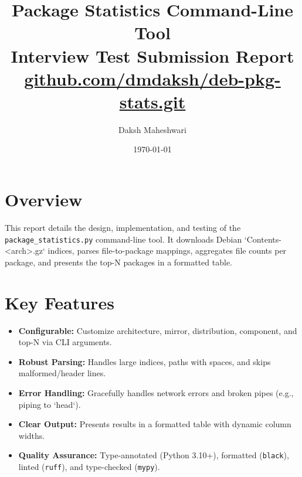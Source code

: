\documentclass[10pt,a4paper]{article}
\title{Package Statistics Command-Line Tool \\ \large Interview Test Submission Report \\ \normalsize \href{https://github.com/dmdaksh/deb-pkg-stats.git}{github.com/dmdaksh/deb-pkg-stats.git}}
\author{Daksh Maheshwari}
\date{\today}
\begin{document}
\pagestyle{empty}
\small %
\maketitle
\vspace{-1.5em} %

\section*{Overview}
\vspace{-0.5em} %
This report details the design, implementation, and testing of the \texttt{package\_statistics.py} command-line tool. It downloads Debian `Contents-<arch>.gz` indices, parses file-to-package mappings, aggregates file counts per package, and presents the top-N packages in a formatted table.

\section*{Key Features}
\vspace{-0.5em}
\begin{itemize}
	\item \textbf{Configurable:} Customize architecture, mirror, distribution, component, and top-N via CLI arguments.
	\item \textbf{Robust Parsing:} Handles large indices, paths with spaces, and skips malformed/header lines.
	\item \textbf{Error Handling:} Gracefully handles network errors and broken pipes (e.g., piping to `head`).
	\item \textbf{Clear Output:} Presents results in a formatted table with dynamic column widths.
	\item \textbf{Quality Assurance:} Type-annotated (Python 3.10+), formatted (\texttt{black}), linted (\texttt{ruff}), and type-checked (\texttt{mypy}).
\end{itemize}
\end{document}
